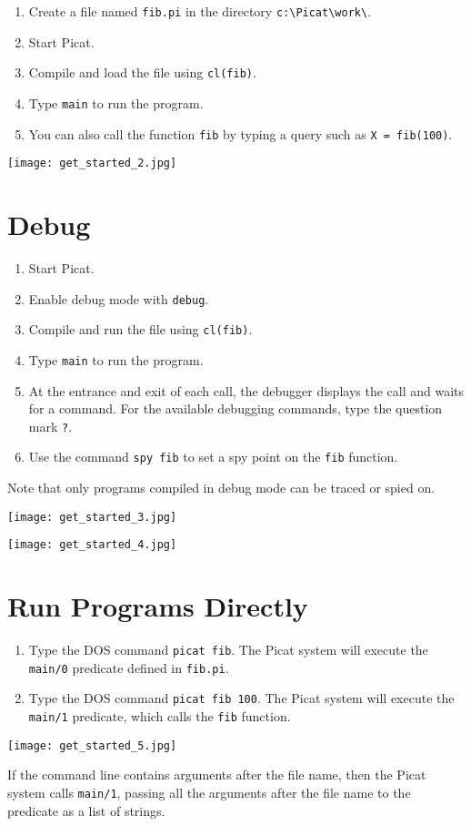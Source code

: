 \documentclass{article}[12pt]
\begin{document}
\begin{enumerate}
\item Create a file named \texttt{fib.pi} in the directory \verb+c:\Picat\work\+.
\item Start Picat.
\item Compile and load the file using \texttt{cl(fib)}.
\item Type \texttt{main} to run the program.
\item You can also call the function {\tt fib} by typing a query such as \verb+X = fib(100)+.
\end{enumerate}

\texttt{[image: get\_started\_2.jpg]}

\clearpage

\section*{\Large{Debug}}
\begin{enumerate}
\item Start Picat.
\item Enable debug mode with \texttt{debug}.
\item Compile and run the file using \texttt{cl(fib)}.
\item Type \texttt{main} to run the program.
\item At the entrance and exit of each call, the debugger displays the call and waits for a command. For the available debugging commands, type the question mark \texttt{?}.
\item Use the command \texttt{spy fib} to set a spy point on the \texttt{fib} function.
\end{enumerate}
Note that only programs compiled in debug mode can be traced or spied on. 

\texttt{[image: get\_started\_3.jpg]}

\texttt{[image: get\_started\_4.jpg]}

\section*{\Large{Run Programs Directly}}
\begin{enumerate}
\item Type the DOS command \texttt{picat fib}. The Picat system will execute the \texttt{main/0} predicate defined in \texttt{fib.pi}.

\item Type the DOS command \texttt{picat fib 100}. The Picat system will execute the \texttt{main/1} predicate, which calls the \texttt{fib} function.
\end{enumerate}

\texttt{[image: get\_started\_5.jpg]}

If the command line contains arguments after the file name, then the Picat system calls \texttt{main/1}, passing all the arguments after the file name to the predicate as a list of strings.
\end{document}
